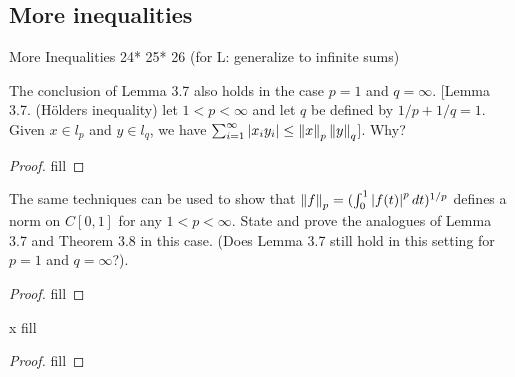 \subsection{More inequalities}

More Inequalities
24*
25*
26 (for L: generalize to infinite sums)


\begin{exercise}{24}
The conclusion of Lemma 3.7 also holds in the case $p=1$ and $q=\infty$. [Lemma 3.7. (H\"olders inequality) let $1<p<\infty$ and let $q$ be defined by $1/p+1/q=1$. Given $x\in l_p$ and $y\in l_q$, we have $\sum_{i=1}^\infty \left\lvert x_iy_i\right\rvert\leq\left\lVert x\right\rVert_p\left\lVert y\right\rVert_q$]. Why?
\end{exercise}
\begin{proof}
fill
\end{proof} 

\begin{exercise}{25}
The same techniques can be used to show that $\left\lVert f\right\rVert_p=(\int_0^1\left\lvert f(t)\right\rvert^pdt)^{1/p}$ defines a norm on $C[0,1]$ for any $1<p<\infty$. State and prove the analogues of Lemma 3.7 and Theorem 3.8 in this case. (Does Lemma 3.7 still hold in this setting for $p=1$ and $q=\infty$?).
\end{exercise}
\begin{proof}
fill
\end{proof} 

\begin{exercise}{x}
fill
\end{exercise}
\begin{proof}
fill
\end{proof} 
